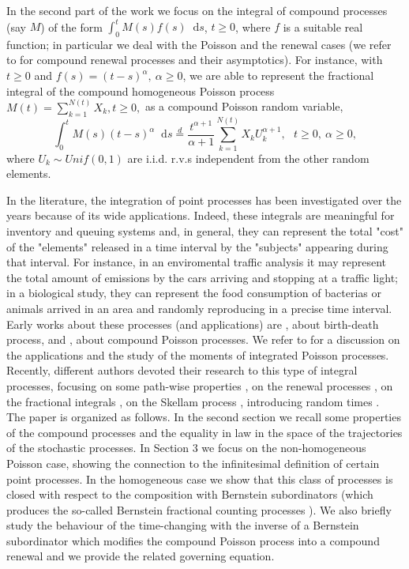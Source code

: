 \documentclass[12pt, twoside, english, headsepline]{article}
\newcommand*\dif{\mathop{}\!\mathrm{d}}  %
\theoremstyle{definition} %
\numberwithin{equation}{section} %
\begin{document}
In the second part of the work we focus on the integral of compound processes (say $M$) of the form $\int_0^t M(s) f(s) \dif s$, $t\ge0$, where $f$ is a suitable real function; in particular we deal with the Poisson and the renewal cases (we refer to \cite{B2022} for compound renewal processes and their asymptotics). For instance, with $t\ge0$ and $f(s) = (t-s)^\alpha,\ \alpha\ge0$, we are able to represent the fractional integral of the compound homogeneous Poisson process $M(t) = \sum_{k=1}^{N(t)}X_k, t\ge0,$ as a compound Poisson random variable,
 $$\int_0^t M(s)(t-s)^\alpha \dif s \stackrel{d}{=} \frac{t^{\alpha+1}}{\alpha+1} \sum_{k=1}^{N(t)} X_k U_k^{\alpha+1},\ \ \ t\ge0,\ \alpha\ge0,$$
 where $U_k\sim Unif(0,1)$ are i.i.d. r.v.s independent from the other random elements.
 
  In the literature, the integration of point processes has been investigated over the years because of its wide applications. Indeed, these integrals are meaningful for inventory and queuing systems and, in general, they can represent the total "cost" of the "elements" released in a time interval by the "subjects" appearing during that interval. For instance, in an enviromental traffic analysis it may represent the total amount of emissions by the cars arriving and stopping at a traffic light; in a biological study, they can represent the food consumption of bacterias or animals arrived in an area and randomly reproducing in a precise time interval. Early works about these processes (and applications) are \cite{GMn1971, Mn1970, N1966, P1966, P1968}, about birth-death process, and \cite{W1971}, about compound Poisson processes. We refer to \cite{N1966} for a discussion on the applications and the study of the moments of integrated Poisson processes. Recently, different authors devoted their research to this type of integral processes, focusing on some path-wise properties \cite{PC2026, PS2002}, on the renewal processes \cite {SVw2007}, on the fractional integrals \cite{CO202, OP2013}, on the Skellam process \cite{X2018}, introducing random times \cite{VK2024}. 
\\



The paper is organized as follows. In the second section we recall some properties of the compound processes and the equality in law in the space of the trajectories of the stochastic processes. In Section 3 we focus on the non-homogeneous Poisson case, showing the connection to the infinitesimal definition of certain point processes. In the homogeneous case we show that this class of processes is closed with respect to the composition with Bernstein subordinators (which produces the so-called Bernstein fractional counting processes \cite{OT2015}). We also briefly study the behaviour of the time-changing with the inverse of a Bernstein subordinator which modifies the compound Poisson process into a compound renewal and we provide the related governing equation.
\end{document}
